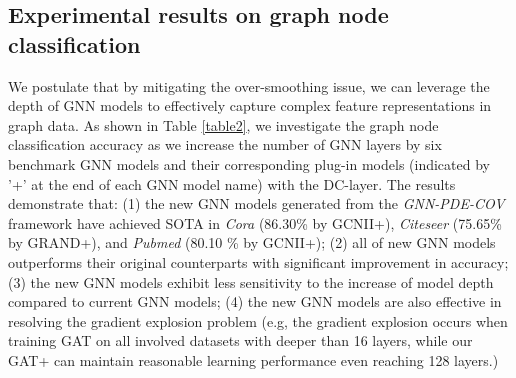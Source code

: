 \documentclass{article}
\begin{document}


\subsection{Experimental results on graph node classification}
\label{exp1}
We postulate that by mitigating the over-smoothing issue, we can leverage the depth of GNN models to effectively capture complex feature representations in graph data. As shown in Table \ref{table2}, we investigate the graph node classification accuracy as we increase the number of GNN layers by six benchmark GNN models and their corresponding plug-in models (indicated by '+' at the end of each GNN model name) with the DC-layer.
The results demonstrate that: (1) the new GNN models generated from the \textit{GNN-PDE-COV} framework have achieved SOTA in \textit{Cora} (86.30\% by GCNII+), \textit{Citeseer} (75.65\% by GRAND+), and \textit{Pubmed} (80.10 \% by GCNII+); (2) all of new GNN models outperforms their original counterparts with significant improvement in accuracy; (3) the new GNN models exhibit less sensitivity to the increase of model depth compared to current GNN models; (4) the new GNN models are also effective in resolving the gradient explosion problem \cite{li2018deeper} (e.g, the gradient explosion occurs when training GAT on all involved datasets with deeper than 16 layers, while our GAT+ can maintain reasonable learning performance even reaching 128 layers.)
\end{document}
